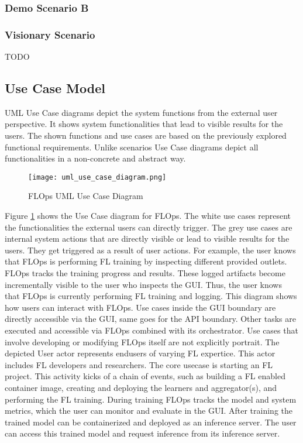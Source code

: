 \subsubsection{Demo Scenario B}

\subsubsection{Visionary Scenario}
TODO

\subsection{Use Case Model}
UML Use Case diagrams depict the system functions from the external user perspective.
It shows system functionalities that lead to visible results for the users.
The shown functions and use cases are based on the previously explored functional requirements.
Unlike scenarios Use Case diagrams depict all functionalities in a non-concrete and abstract way. \cite{book:bruegge}

\begin{figure}[p]
    \begin{adjustwidth}{-0.1\paperwidth}{-0.1\paperwidth}
        \centering
        \texttt{[image: uml\_use\_case\_diagram.png]}
        \caption{FLOps UML Use Case Diagram}
        \label{fig:uml_use_case_diagram}
    \end{adjustwidth}
\end{figure}

Figure \ref{fig:uml_use_case_diagram} shows the Use Case diagram for FLOps.
The white use cases represent the functionalities the external users can directly trigger.
The grey use cases are internal system actions that are directly visible or lead to visible results for the users.
They get triggered as a result of user actions.
For example, the user knows that FLOps is performing FL training by inspecting different provided outlets.
FLOps tracks the training progress and results.
These logged artifacts become incrementally visible to the user who inspects the GUI.
Thus, the user knows that FLOps is currently performing FL training and logging.
This diagram shows how users can interact with FLOps.
Use cases inside the GUI boundary are directly accessible via the GUI, same goes for the API boundary.
Other tasks are executed and accessible via FLOps combined with its orchestrator.
Use cases that involve developing or modifying FLOps itself are not explicitly portrait.
The depicted User actor represents endusers of varying FL expertice.
This actor includes FL developers and researchers.
The core usecase is starting an FL project.
This activity kicks of a chain of events, such as building a FL enabled container image, creating and deploying the learners and aggregator(s), and performing the FL training.
During training FLOps tracks the model and system metrics, which the user can monitor and evaluate in the GUI.
After training the trained model can be containerized and deployed as an inference server.
The user can access this trained model and request inference from its inference server.



